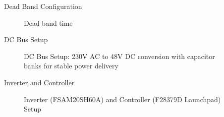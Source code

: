 \begin{frame}{Dead Band Configuration}
	\begin{figure}
		\centering

		\caption{Dead band time}
	\end{figure}
\end{frame}





\begin{frame}{DC Bus Setup}
	\begin{figure}
		\centering
		\caption{DC Bus Setup: 230V AC to 48V DC conversion with capacitor banks for stable power delivery}
	\end{figure}
\end{frame}

\begin{frame}{Inverter and Controller}
	\begin{figure}
		\centering
		\caption{Inverter (FSAM20SH60A) and Controller (F28379D Launchpad) Setup}
	\end{figure}
\end{frame}

